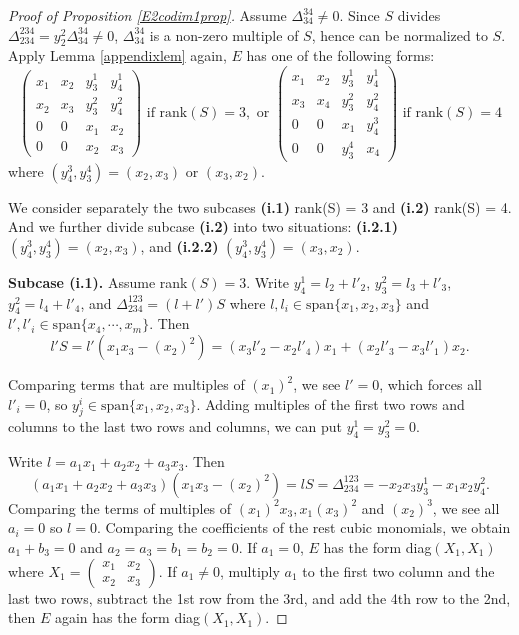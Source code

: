 \documentclass[10pt]{article} %
\theoremstyle{definition}
\begin{document}
\begin{proof}[Proof of Proposition \ref{E2codim1prop}]
Assume $\Delta^{34}_{34}\neq0$. Since $S$ divides $\Delta^{234}_{234}=y^2_2\Delta^{34}_{34}\neq 0$, $\Delta^{34}_{34}$ is a non-zero multiple of $S$, hence can be normalized to $S$. Apply Lemma \ref{appendixlem} again, $E$ has one of the following forms:
$$\begin{pmatrix}
x_1 & x_2 & y^1_3 & y^1_4\\
x_2 & x_3 & y^2_3 & y^2_4\\
0 & 0 & x_1 & x_2\\
0 & 0 & x_2 & x_3
\end{pmatrix}\text{ if rank}(S)=3,\text { or }
\begin{pmatrix}
x_1 & x_2 & y^1_3 & y^1_4\\
x_3 & x_4 & y^2_3 & y^2_4\\
0 & 0 & x_1 & y^3_4\\
0 & 0 & y^4_3 & x_4
\end{pmatrix}\text{ if rank}(S)=4$$
where $(y^3_4,y^4_3)=(x_2,x_3)$ or $(x_3,x_2)$. 

We consider separately the two subcases \textbf{(i.1)} rank(S) = 3 and \textbf{(i.2)} rank(S) = 4. And we further divide subcase \textbf{(i.2)} into two situations: \textbf{(i.2.1)} $(y^3_4,y^4_3)=(x_2,x_3)$, and \textbf{(i.2.2)} $(y^3_4,y^4_3)=(x_3,x_2)$.

\textbf{Subcase (i.1).} Assume rank$(S)=3$. Write $y^1_4=l_2+l'_2$, $y^2_3=l_3+l'_3$, $y^2_4=l_4+l'_4$, and $\Delta^{123}_{234}=(l+l')S$ where $l,l_i\in\mathrm{span}\{x_1,x_2,x_3\}$ and $l',l'_i\in\mathrm{span}\{x_4,\cdots,x_m\}$. Then  
$$l'S=l'(x_1x_3-(x_2)^2)=(x_3l'_2-x_2l'_4)x_1+(x_2l'_3-x_3l'_1)x_2.$$

Comparing terms that are multiples of $(x_1)^2$, we see $l'=0$, which forces all $l'_i=0$, so $y^i_j\in\mathrm{span}\{x_1,x_2,x_3\}$. Adding multiples of the first two rows and columns to the last two rows and columns, we can put $y^1_4=y^2_3=0$. 

Write $l=a_1x_1+a_2x_2+a_3x_3$. Then
$$(a_1x_1+a_2x_2+a_3x_3)(x_1x_3-(x_2)^2)=lS=\Delta^{123}_{234}=-x_2x_3y^1_3-x_1x_2y^2_4.$$
Comparing the terms of multiples of $(x_1)^2x_3, x_1(x_3)^2$ and $(x_2)^3$, we see all $a_i=0$ so $l=0$. Comparing the coefficients of the rest cubic monomials, we obtain $a_1+b_3=0$ and $a_2=a_3=b_1=b_2=0$. If $a_1=0$, $E$ has the form diag$(X_1,X_1)$ where $X_1=\begin{pmatrix}
x_1 & x_2\\
x_2 & x_3
\end{pmatrix}$.
If $a_1\neq 0$, multiply $a_1$ to the first two column and the last two rows, subtract the 1st row from the 3rd, and add the 4th row to the 2nd, then $E$ again has the form diag$(X_1,X_1)$.


\end{proof}
\end{document}
